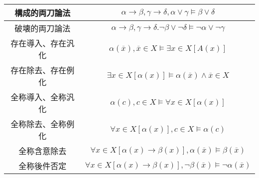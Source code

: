 \documentclass[a4paper]{jsarticle}
\begin{document}
\begin{thm}
\begin{longtable}[c]{|c|c|}
\hline
構成的両刀論法 & $\alpha \rightarrow \beta,\gamma \rightarrow \delta,\alpha \vee \gamma \vDash \beta \vee \delta$ \\
\hline
破壊的両刀論法 & $\alpha \rightarrow \beta,\gamma \rightarrow \delta.\neg\beta \vee \neg\delta \vDash \neg\alpha \vee \neg\gamma$ \\
\hline
存在導入、存在汎化 & $\alpha\left( \overline{x} \right),\overline{x} \in X \vDash \exists x \in X\left[ A(x) \right]$ \\
\hline
存在除去、存在例化 & $\exists x \in X\left[ \alpha(x) \right] \vDash \alpha\left( \overline{x} \right) \land \overline{x} \in X$ \\
\hline
全称導入、全称汎化 & $\alpha(c),c \in X \vDash \forall x \in X\left[ \alpha(x) \right]$ \\
\hline
全称除去、全称例化 & $\forall x \in X\left[ \alpha(x) \right],c \in X \vDash \alpha(c)$ \\
\hline
全称含意除去 & $\forall x \in X\left[ \alpha(x) \rightarrow \beta(x) \right],\alpha\left( \overline{x} \right) \vDash \beta\left( \overline{x} \right)$ \\
\hline
全称後件否定 & $\forall x \in X\left[ \alpha(x) \rightarrow \beta(x) \right],\neg\beta\left( \overline{x} \right) \vDash \neg\alpha\left( \overline{x} \right)$ \\
\hline
\end{longtable}
\end{thm}
\end{document}
